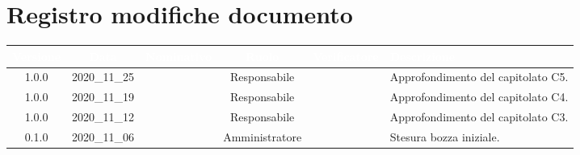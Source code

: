 \section*{Registro modifiche documento}
{
\renewcommand{\arraystretch}{1.5}
\centering
\begin{longtable}{ c c  C{2.3cm} c C{3cm} C{3.2cm}}


 \textcolor{white}{\textbf{Versione}}&
    \textcolor{white}{\textbf{Data}}&
    \textcolor{white}{\textbf{Nominativo}}&
    \textcolor{white}{\textbf{Ruolo}}&
    \textcolor{white}{\textbf{Verificatore}}&
    \textcolor{white}{\textbf{Descrizione}}\\	
    \endhead
    
    1.0.0 & 2020\_11\_25 & \TL{} & Responsabile & \MM{} & Approfondimento del capitolato C5.  \\
    
    1.0.0 & 2020\_11\_19 & \MM{} & Responsabile & \TL{} & Approfondimento del capitolato C4.  \\
    
    1.0.0 & 2020\_11\_12 & \TL{} & Responsabile & \MM{} & Approfondimento del capitolato C3.  \\
            
    0.1.0 & 2020\_11\_06 & \TG{} & Amministratore & \MM{} & Stesura bozza iniziale.  \\
			
\end{longtable}
}